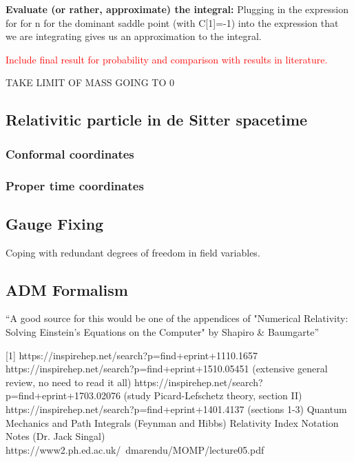 \documentclass[12pt]{revtex4}
\newcommand{\red}{\textcolor{red}}
\begin{document}
\textbf{Evaluate (or rather, approximate) the integral:}
Plugging in the expression for  for n for the dominant saddle point (with C[1]=-1) into the expression that we are integrating gives us an approximation to the integral.

\red{Include final result for probability and comparison with results in literature.}

TAKE LIMIT OF MASS GOING TO 0
\subsection{Relativitic particle in de Sitter spacetime}

\subsubsection{Conformal coordinates}


\subsubsection{Proper time coordinates}

\subsection{Gauge Fixing} \label{gauge}
Coping with redundant degrees of freedom in field variables.

\subsection{ADM Formalism} \label{ADM}
``A good source for this would be one of the appendices of "Numerical Relativity: Solving Einstein's Equations on the Computer" by Shapiro \& Baumgarte''

\begin{thebibliography}{}

[1] https://inspirehep.net/search?p=find+eprint+1110.1657 \newline
[2] https://inspirehep.net/search?p=find+eprint+1510.05451  (extensive general review, no need to read it all) \newline
[3] https://inspirehep.net/search?p=find+eprint+1703.02076   (study Picard-Lefschetz theory, section II) \newline
[4] https://inspirehep.net/search?p=find+eprint+1401.4137   (sections 1-3) \newline
[5] Quantum Mechanics and Path Integrals (Feynman and Hibbs) \newline
[6] Relativity Index Notation Notes (Dr. Jack Singal) \newline
[7] https://www2.ph.ed.ac.uk/~dmarendu/MOMP/lecture05.pdf \newline
[8] \newline
\end{thebibliography}
\end{document}

